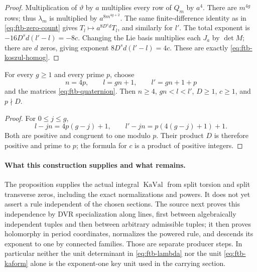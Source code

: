 \begin{proof}
Multiplication of \(\vartheta\) by \(a\) multiplies every row of
\(Q_m\) by \(a^4\).  There are \(m^{4g}\) rows; thus
\(\lambda_m\) is multiplied by \(a^{8m^{4g+2}}\).
The same finite-difference identity as in
\eqref{eq:ftb-zero-count} gives
\(T_l\mapsto a^{8D^sd}T_l\), and similarly for \(l'\).
The total exponent is \(-16D^sd(l'-l)=-8c\).
Changing the Lie basis multiplies each \(J_a\) by \(\det M\);
there are \(d\) zeros, giving exponent
\(8D^sd(l'-l)=4c\).
These are exactly \eqref{eq:ftb-koszul-homog}.
\end{proof}

\begin{srlemma}
\label{lem:ftb-key-numerical-data}
For every \(g\geq1\) and every prime \(p\), choose
\[
 n=4p,\qquad l=gn+1,\qquad l'=gn+1+p
\]
and the matrices \eqref{eq:ftb-quaternion}.
Then \(n\geq4\), \(gn<l<l'\), \(D\geq1\), \(c\geq1\),
and \(p\nmid D\).
\end{srlemma}
\begin{proof}
For \(0\leq j\leq g\),
\[
 l-jn=4p(g-j)+1,\qquad
 l'-jn=p(4(g-j)+1)+1 .
\]
Both are positive and congruent to one modulo \(p\).
Their product \(D\) is therefore positive and prime to \(p\);
the formula for \(c\) is a product of positive integers.
\end{proof}

\paragraph{What this construction supplies and what remains.}
The proposition supplies the actual integral \(\operatorname{KaVal}\)
from split torsion and split transverse zeros, including the exact
normalizations and powers.  It does not yet assert a rule independent
of the chosen sections.  The source next proves this independence by
DVR specialization along lines, first between algebraically independent
tuples and then between arbitrary admissible tuples; it then proves
holomorphy in period coordinates, normalizes the powered rule, and
descends its exponent to one by connected families.
Those are separate producer steps.  In particular neither the unit
determinant in \eqref{eq:ftb-lambda} nor the unit
\eqref{eq:ftb-kaform} alone is the exponent-one key unit used in the
carrying section.
